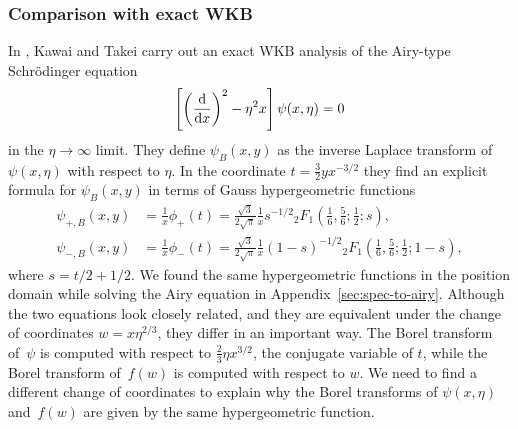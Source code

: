 \documentclass[pdftex]{sigma}
\numberwithin{equation}{section}
\begin{document}
\subsubsection{Comparison with exact WKB}
%
In \cite{kawai-takei}, Kawai and Takei carry out an exact WKB analysis of the Airy-type Schr\"{o}dinger equation%
\begin{equation}
\label{WKB_Airy}
\left[\left(\frac{\rm d}{{\rm d}x}\right)^2 - \eta^2 x \right] \psi(x, \eta) = 0
\end{equation}
in the $\eta \to \infty$ limit. They define $\psi_B(x, y)$ as the inverse Laplace transform of $\psi(x, \eta)$ with respect to $\eta$. In the coordinate $t=\frac{3}{2}yx^{-3/2}$ they find an explicit formula for $\psi_B(x,y)$ in terms of Gauss hypergeometric functions
\begin{align*}
\psi_{+,B}(x,y)&=\frac{1}{x}\phi_+(t)=\frac{\sqrt{3}}{2\sqrt{\pi}}\frac{1}{x}s^{-1/2} {}_2F_1\left(\frac{1}{6},\frac{5}{6};\frac{1}{2};s\right),\\
\psi_{-,B}(x,y)&=\frac{1}{x}\phi_-(t)=\frac{\sqrt{3}}{2\sqrt{\pi}}\frac{1}{x}(1-s)^{-1/2} {}_2F_1\left(\frac{1}{6},\frac{5}{6};\frac{1}{2};1-s\right),
\end{align*}
where $s=t/2+1/2$. We found the same hypergeometric functions in the position domain while solving the Airy equation
in Appendix~\ref{sec:spec-to-airy}. Although the two equations look closely related, and they are equivalent under the change of coordinates $w=x\eta^{2/3}$, they differ in an important way. The Borel transform of~$\psi$ is computed with respect to $\frac{2}{3}\eta x^{3/2}$, the conjugate variable of $t$, while the Borel transform of~$f(w)$ is computed with respect to $w$. We need to find a different change of coordinates to explain why the Borel transforms of $\psi(x,\eta)$ and~$f(w)$ are given by the same hypergeometric function.
\end{document}
